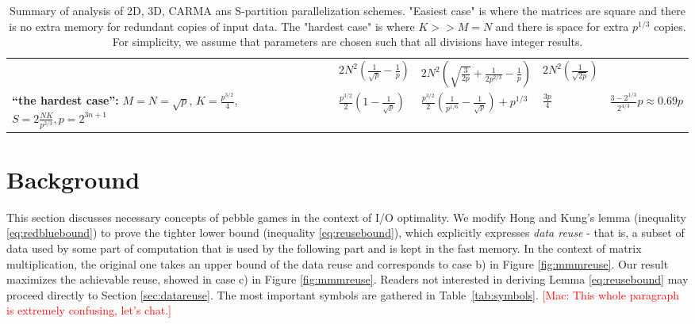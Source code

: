 \documentclass[sigplan,review,anonymous]{acmart}\settopmatter{printfolios=true,printccs=false,printacmref=false}
\newcommand\mac[1]{\textcolor{red}{[Mac: #1]}}
\begin{document}
\begin{table}
\begin{tabular}{lllll}
&
$2N^2 \left(\frac{1}{\sqrt{p}} - \frac{1}{p} \right)$
&
$2N^2 \left(\sqrt{\frac{3}{2p}} + \frac{1}{2p^{2/3}} - \frac{1}{p} \right)$
& 
$2N^2 \left(\frac{1}{\sqrt{2p}} \right)$
%
\vspace{1.0em}
%
\\
%
%
\makecell[l]{\textbf{``the hardest case'':}\\
$M = N = \sqrt{p}$,\\
$K = \frac{p^{3/2}}{4}$,\\
$S = 2\frac{NK}{p^{2/3}}, p=2^{3n + 1}$}
&
$\frac{p^{3/2}}{2}\left(1 - \frac{1}{\sqrt{p}}\right)$
&
$\frac{p^{3/2}}{2}\left(\frac{1}{p^{1/6}} - \frac{1}{\sqrt{p}}\right) + p^{1/3}$
&
$\frac{3p}{4}$
& 
$\frac{3-2^{1/3}}{2^{4/3}}p \approx 0.69 p$
%
\\
%
\bottomrule
%
\end{tabular}
%
\caption{Summary of analysis of 2D, 3D, CARMA ans S-partition parallelization 
schemes. "Easiest case" is where the matrices are square and there is no extra 
memory for redundant copies of input data. The "hardest case" is where $K >> M 
= N$ and there is space for extra $p^{1/3}$ copies. For simplicity, we assume 
that parameters are chosen such that all divisions have integer results.}
%
\label{tab:summary}
\end{table}


\section{Background}
\label{sec:background}

This section discusses necessary concepts of pebble games in the context of I/O
optimality. We modify Hong and Kung's lemma (inequality \ref{eq:redbluebound})
to prove the tighter lower bound (inequality \ref{eq:reusebound}), which
explicitly expresses \emph{data reuse} - that is, a subset of data used by some 
part of computation that is used by the following part and is kept in the 
fast memory. In the context of matrix 
multiplication, the
original one takes an upper bound of the data reuse and corresponds to case b)
in Figure \ref{fig:mmmreuse}. Our result maximizes the achievable reuse, showed
in case c) in Figure \ref{fig:mmmreuse}.  Readers not interested in deriving
Lemma \ref{eq:reusebound} may proceed directly to Section \ref{sec:datareuse}.
The most important symbols are gathered in Table~\ref{tab:symbols}.
%
\mac{This whole paragraph is extremely confusing, let's chat.}
\end{document}
